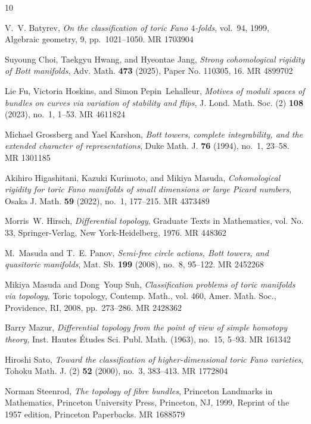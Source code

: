 \documentclass[10pt,a4paper]{amsart}
\numberwithin{equation}{section}
\begin{document}
\providecommand{\bysame}{\leavevmode\hbox to3em{\hrulefill}\thinspace}
\providecommand{\MR}{\relax\ifhmode\unskip\space\fi MR }
\providecommand{\MRhref}[2]{%
  \href{http://www.ams.org/mathscinet-getitem?mr=#1}{#2}
}
\providecommand{\href}[2]{#2}
\begin{thebibliography}{10}

V.~V. Batyrev, \emph{On the classification of toric {F}ano {$4$}-folds},
  vol.~94, 1999, Algebraic geometry, 9, pp.~1021--1050. \MR{1703904}

Suyoung Choi, Taekgyu Hwang, and Hyeontae Jang, \emph{Strong cohomological
  rigidity of {B}ott manifolds}, Adv. Math. \textbf{473} (2025), Paper No.
  110305, 16. \MR{4899702}

Lie Fu, Victoria Hoskins, and Simon Pepin~Lehalleur, \emph{Motives of moduli
  spaces of bundles on curves via variation of stability and flips}, J. Lond.
  Math. Soc. (2) \textbf{108} (2023), no.~1, 1--53. \MR{4611824}

Michael Grossberg and Yael Karshon, \emph{Bott towers, complete integrability,
  and the extended character of representations}, Duke Math. J. \textbf{76}
  (1994), no.~1, 23--58. \MR{1301185}

Akihiro Higashitani, Kazuki Kurimoto, and Mikiya Masuda, \emph{Cohomological
  rigidity for toric {F}ano manifolds of small dimensions or large {P}icard
  numbers}, Osaka J. Math. \textbf{59} (2022), no.~1, 177--215. \MR{4373489}

Morris~W. Hirsch, \emph{Differential topology}, Graduate Texts in Mathematics,
  vol. No. 33, Springer-Verlag, New York-Heidelberg, 1976. \MR{448362}

M.~Masuda and T.~E. Panov, \emph{Semi-free circle actions, {B}ott towers, and
  quasitoric manifolds}, Mat. Sb. \textbf{199} (2008), no.~8, 95--122.
  \MR{2452268}

Mikiya Masuda and Dong~Youp Suh, \emph{Classification problems of toric
  manifolds via topology}, Toric topology, Contemp. Math., vol. 460, Amer.
  Math. Soc., Providence, RI, 2008, pp.~273--286. \MR{2428362}

Barry Mazur, \emph{Differential topology from the point of view of simple
  homotopy theory}, Inst. Hautes \'Etudes Sci. Publ. Math. (1963), no.~15,
  5--93. \MR{161342}

Hiroshi Sato, \emph{Toward the classification of higher-dimensional toric
  {F}ano varieties}, Tohoku Math. J. (2) \textbf{52} (2000), no.~3, 383--413.
  \MR{1772804}

Norman Steenrod, \emph{The topology of fibre bundles}, Princeton Landmarks in
  Mathematics, Princeton University Press, Princeton, NJ, 1999, Reprint of the
  1957 edition, Princeton Paperbacks. \MR{1688579}

\end{thebibliography}
\end{document}
